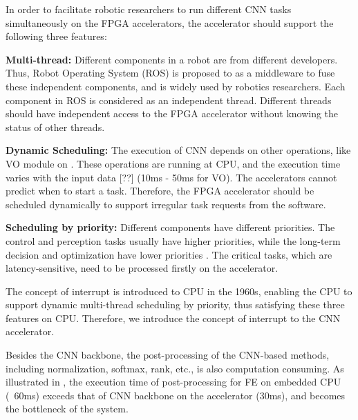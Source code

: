 In order to facilitate robotic researchers to run different CNN tasks simultaneously on the FPGA accelerators, the accelerator should support the following three features:

\textbf{Multi-thread:} Different components in a robot are from different developers. Thus, Robot Operating System (ROS) \cite{quigley2009ros} is proposed to as a middleware to fuse these independent components, and is widely used by robotics researchers. Each component in ROS is considered as an independent thread. Different threads should have independent access to the FPGA accelerator without knowing the status of other threads.



\textbf{Dynamic Scheduling:} The execution of CNN depends on other operations, like VO module on . 
These operations are running at CPU, and the execution time varies with the input data [??] (10ms - 50ms for VO). 
The accelerators cannot predict when to start a task. 
Therefore, the FPGA accelerator should be scheduled dynamically to support irregular task requests from the software.

\textbf{Scheduling by priority:} Different components have different priorities. The control and perception tasks usually have higher priorities, while the long-term decision and optimization have lower priorities \cite{RamsauerKLM17}. The critical tasks, which are latency-sensitive,  need to be processed firstly on the accelerator.

The concept of interrupt \cite{jen1974processor} is introduced to CPU in the 1960s, enabling the CPU to support dynamic multi-thread scheduling by priority, thus satisfying these three features on CPU. Therefore, we introduce the concept of interrupt to the CNN accelerator.

Besides the CNN backbone, the post-processing of the CNN-based methods, including normalization, softmax, rank, etc., is also computation consuming. As illustrated in , the execution time of post-processing for FE on embedded CPU (~60ms) exceeds that of CNN backbone on the accelerator (30ms), and becomes the bottleneck of the system.

